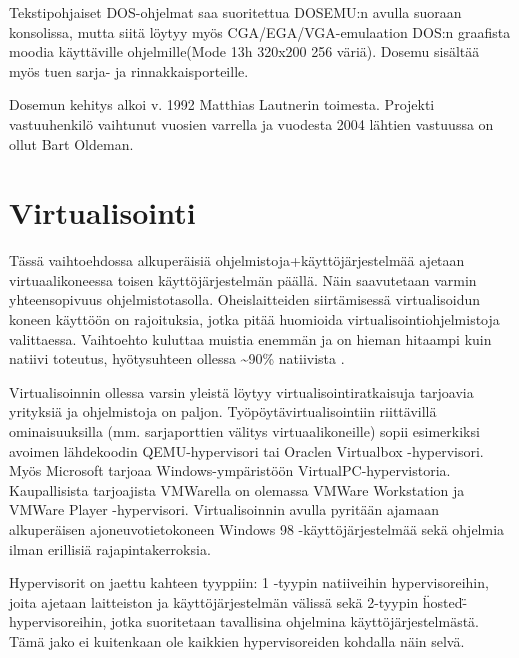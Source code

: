 Tekstipohjaiset DOS-ohjelmat saa suoritettua DOSEMU:n avulla suoraan konsolissa, mutta siitä löytyy myös CGA/EGA/VGA-emulaation DOS:n graafista moodia käyttäville ohjelmille(Mode 13h 320x200 256 väriä). Dosemu sisältää myös tuen sarja- ja rinnakkaisporteille.

Dosemun kehitys alkoi v. 1992 Matthias Lautnerin toimesta. Projekti vastuuhenkilö vaihtunut vuosien varrella ja vuodesta 2004 lähtien vastuussa on ollut Bart Oldeman.




\section{Virtualisointi}

Tässä vaihtoehdossa alkuperäisiä ohjelmistoja+käyttöjärjestelmää ajetaan virtuaalikoneessa toisen käyttöjärjestelmän päällä. Näin saavutetaan varmin yhteensopivuus ohjelmistotasolla. Oheislaitteiden siirtämisessä virtualisoidun koneen käyttöön on rajoituksia, jotka pitää huomioida virtualisointiohjelmistoja valittaessa. Vaihtoehto kuluttaa muistia enemmän ja on hieman hitaampi kuin natiivi toteutus, hyötysuhteen ollessa \textasciitilde{}90\%  natiivista \cite{virtnat_anadtech}.


Virtualisoinnin ollessa varsin yleistä löytyy virtualisointiratkaisuja tarjoavia yrityksiä ja ohjelmistoja on paljon. Työpöytävirtualisointiin riittävillä ominaisuuksilla (mm. sarjaporttien välitys virtuaalikoneille) sopii esimerkiksi avoimen lähdekoodin QEMU-hypervisori tai Oraclen Virtualbox -hypervisori. Myös Microsoft tarjoaa Windows-ympäristöön VirtualPC-hypervistoria. Kaupallisista tarjoajista VMWarella on olemassa VMWare Workstation ja VMWare Player -hypervisori. Virtualisoinnin avulla pyritään ajamaan alkuperäisen ajoneuvotietokoneen Windows 98 -käyttöjärjestelmää sekä ohjelmia ilman erillisiä rajapintakerroksia.

Hypervisorit on jaettu kahteen tyyppiin: 1 -tyypin natiiveihin hypervisoreihin, joita ajetaan laitteiston ja käyttöjärjestelmän välissä sekä 2-tyypin \"hosted\" -hypervisoreihin, jotka suoritetaan tavallisina ohjelmina käyttöjärjestelmästä. Tämä jako ei kuitenkaan ole kaikkien hypervisoreiden kohdalla näin selvä. %


